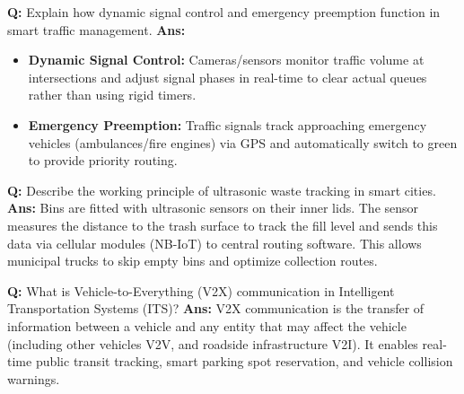\documentclass[10pt,a4paper,twocolumn]{article}
\begin{document}
\begin{tcolorbox}[
  colback=white,
  colframe=UnitColorTen,
  colbacktitle=gray!10!white,
  coltitle=black,
  fonttitle=\bfseries\sffamily\small,
  title={Unit X $\bullet$ Card 3},
  boxrule=1.2pt,
  arc=2mm,
  outer arc=2mm,
  boxsep=1.5mm,
  top=1mm,
  bottom=1mm,
  left=1.5mm,
  right=1.5mm,
  before skip=2.5mm,
  after skip=2.5mm
]
\textbf{Q:} Explain how dynamic signal control and emergency preemption function in smart traffic management.
\tcbline
\textbf{Ans:} \begin{itemize}
  \item \textbf{Dynamic Signal Control:} Cameras/sensors monitor traffic volume at intersections and adjust signal phases in real-time to clear actual queues rather than using rigid timers.
  \item \textbf{Emergency Preemption:} Traffic signals track approaching emergency vehicles (ambulances/fire engines) via GPS and automatically switch to green to provide priority routing.
\end{itemize}
\end{tcolorbox}


\begin{tcolorbox}[
  colback=white,
  colframe=UnitColorTen,
  colbacktitle=gray!10!white,
  coltitle=black,
  fonttitle=\bfseries\sffamily\small,
  title={Unit X $\bullet$ Card 4},
  boxrule=1.2pt,
  arc=2mm,
  outer arc=2mm,
  boxsep=1.5mm,
  top=1mm,
  bottom=1mm,
  left=1.5mm,
  right=1.5mm,
  before skip=2.5mm,
  after skip=2.5mm
]
\textbf{Q:} Describe the working principle of ultrasonic waste tracking in smart cities.
\tcbline
\textbf{Ans:} Bins are fitted with ultrasonic sensors on their inner lids. The sensor measures the distance to the trash surface to track the fill level and sends this data via cellular modules (NB-IoT) to central routing software. This allows municipal trucks to skip empty bins and optimize collection routes.
\end{tcolorbox}


\begin{tcolorbox}[
  colback=white,
  colframe=UnitColorTen,
  colbacktitle=gray!10!white,
  coltitle=black,
  fonttitle=\bfseries\sffamily\small,
  title={Unit X $\bullet$ Card 5},
  boxrule=1.2pt,
  arc=2mm,
  outer arc=2mm,
  boxsep=1.5mm,
  top=1mm,
  bottom=1mm,
  left=1.5mm,
  right=1.5mm,
  before skip=2.5mm,
  after skip=2.5mm
]
\textbf{Q:} What is Vehicle-to-Everything (V2X) communication in Intelligent Transportation Systems (ITS)?
\tcbline
\textbf{Ans:} V2X communication is the transfer of information between a vehicle and any entity that may affect the vehicle (including other vehicles V2V, and roadside infrastructure V2I). It enables real-time public transit tracking, smart parking spot reservation, and vehicle collision warnings.
\end{tcolorbox}
\end{document}
